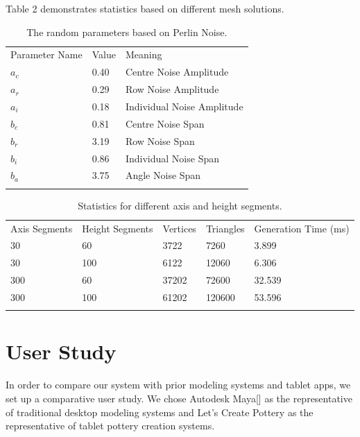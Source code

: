 Table 2 demonstrates statistics based on different mesh solutions. 

\begin{table}
\caption{The random parameters based on Perlin Noise.}
\label{tab:1}       %
\begin{tabular}{lll}
\hline\noalign{\smallskip}
Parameter Name & Value & Meaning  \\
\noalign{\smallskip}\hline\noalign{\smallskip}
$a_{c}$ & 0.40 & Centre Noise Amplitude \\
$a_{r}$ & 0.29 & Row Noise Amplitude \\
$a_{i}$ & 0.18 & Individual Noise Amplitude \\
$b_{c}$ & 0.81 & Centre Noise Span \\
$b_{r}$ & 3.19 & Row Noise Span \\
$b_{i}$ & 0.86 & Individual Noise Span \\
$b_{a}$ & 3.75 & Angle Noise Span \\
\noalign{\smallskip}\hline
\end{tabular}
\end{table}


\begin{table}
\caption{Statistics for different axis and height segments.}
\label{tab:1}       %
\begin{tabular}{lllll}
\hline\noalign{\smallskip}
Axis Segments & Height Segments & Vertices & Triangles & Generation Time (ms)\\
\noalign{\smallskip}\hline\noalign{\smallskip}
30 & 60 & 3722 & 7260 & 3.899 \\
30 & 100 & 6122 & 12060 & 6.306 \\
300 & 60 & 37202 & 72600 & 32.539 \\
300 & 100 & 61202 & 120600 & 53.596 \\
\noalign{\smallskip}\hline
\end{tabular}
\end{table}

\section{User Study}
\label{sec:6}
In order to compare our system with prior modeling systems and tablet apps, we set up a comparative user study. We chose Autodesk Maya[] as the representative of traditional desktop modeling systems and Let's Create Pottery as the representative of tablet pottery creation systems.

